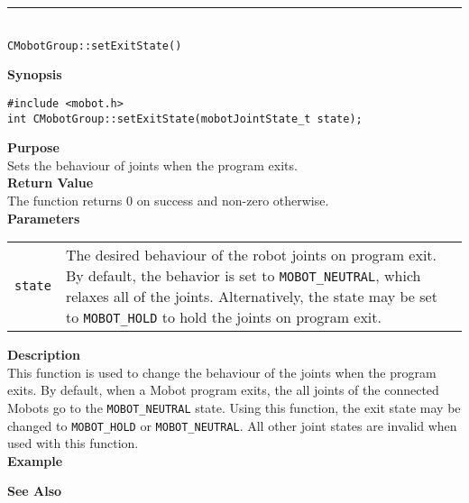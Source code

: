 \noindent
\vspace{5pt}
\rule{4.5in}{0.015in}\\
\noindent
{\LARGE \texttt{CMobotGroup::setExitState()}}\\
{}

\noindent
{\bf Synopsis}
\vspace{-8pt}
\begin{verbatim}
#include <mobot.h>
int CMobotGroup::setExitState(mobotJointState_t state);
\end{verbatim}

\noindent
{\bf Purpose}\\
Sets the behaviour of joints when the program exits.\\

\noindent
{\bf Return Value}\\
The function returns 0 on success and non-zero otherwise.\\

\noindent
{\bf Parameters}
\vspace{-0.1in}
\begin{description}
\item               
\begin{tabular}{p{10 mm}p{145 mm}}
\texttt{state} & The desired behaviour of the robot joints on program exit. By
default, the behavior is set to \texttt{MOBOT\_NEUTRAL}, which relaxes all of
the joints. Alternatively, the state may be set to \texttt{MOBOT\_HOLD} to hold
the joints on program exit. \\
\end{tabular}
\end{description}

\noindent
{\bf Description}\\
This function is used to change the behaviour of the joints when the program
exits. By default, when a Mobot program exits, the all joints of the connected
Mobots go to the \texttt{MOBOT\_NEUTRAL} state. Using this function, the exit
state may be changed to \texttt{MOBOT\_HOLD} or \texttt{MOBOT\_NEUTRAL}. All
other joint states are invalid when used with this function.
\noindent\\
{\bf Example}\\
\noindent

\noindent
{\bf See Also}\\

